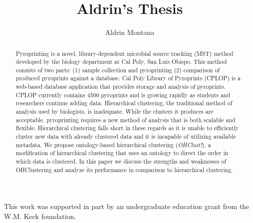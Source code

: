 \documentclass[12pt]{ucthesis}
\begin{document}
\title{Aldrin's Thesis}
\author{Aldrin Montana}



\maketitle
\begin{frontmatter}
   \copyrightpage

   \committeemembershippage

   \begin{abstract}
      Pyroprinting is a novel, library-dependent microbial source
      tracking (MST) method developed by the biology department at Cal Poly,
      San Luis Obispo. This method consists of two parts: (1) sample collection
      and pyroprinting (2) comparison of produced pyroprints against a
      database. Cal Poly Library of Pyroprints (CPLOP) is a web-based database
      application that provides storage and analysis of pyroprints. CPLOP
      currently contains 4500 pyroprints and is growing rapidly as students and
      researchers continue adding data. Hierarchical clustering, the
      traditional method of analysis used by biologists, is inadequate. While
      the clusters it produces are acceptable, pyroprinting requires a new
      method of analysis that is both scalable and flexible. Hierarchical
      clustering falls short in these regards as it is unable to efficiently
      cluster new data with already clustered data and it is incapable of
      utilizing available metadata. We propose ontology-based hierarchical
      clustering (\textit{OHClust!}), a modification of hierarchical clustering
      that uses an ontology to direct the order in which data is clustered. In
      this paper we discuss the strengths and weaknesses of OHClustering and
      analyze its performance in comparison to hierarchical clustering.
   \end{abstract}

   \begin{acknowledgements}
      This work was supported in part by an undergraduate education grant from
      the W.M. Keck foundation.
   \end{acknowledgements}

   \tableofcontents

   \listoftables
   \listoffigures
\end{frontmatter}
\end{document}
